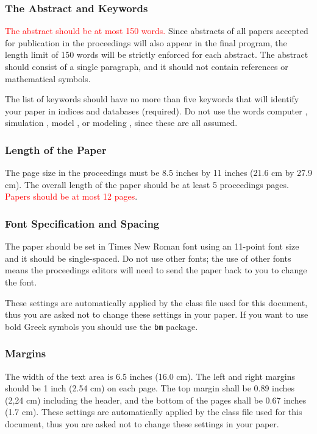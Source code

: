 \documentclass{article}
\begin{document}
\subsubsection{The Abstract and Keywords}
\textcolor{red}{The abstract should be at most 150 words.} Since abstracts of all papers accepted for publication in the proceedings will also appear in the final program, the length limit of 150 words will be strictly enforced for each abstract. The abstract should consist of a single paragraph, and it should not contain references or mathematical symbols. 

The list of keywords should have no more than five keywords that will identify your paper in indices and databases (required). Do not use the words  computer ,  simulation ,  model , or  modeling , since these are all assumed.

\subsubsection{Length of the Paper}
The page size in the proceedings must be 8.5 inches by 11 inches (21.6 cm by 27.9 cm). The overall length of the paper should be at least 5 proceedings pages. \textcolor{red}{Papers should be at most 12 pages}.

\subsubsection{Font Specification and Spacing}
The paper should be set in Times New Roman font using an 11-point font size and it should be single-spaced. Do not use other fonts; the use of other fonts means the proceedings editors will need to send the paper back to you to change the font.

These settings are automatically applied by the class file used for this document, thus you are asked not to change these settings in your paper. If you want to use bold Greek symbols you should use the \texttt{bm} package.

\subsubsection{Margins}
\label{sec:margins}

The width of the text area is 6.5 inches (16.0 cm). The left and right margins should be 1 inch (2.54 cm) on each page. The top margin shall be 0.89 inches (2,24 cm) including the header, and the bottom of the pages shall be 0.67 inches (1.7 cm). These settings are automatically applied by the class file used for this document, thus you are asked not to change these settings in your paper.
\end{document}
